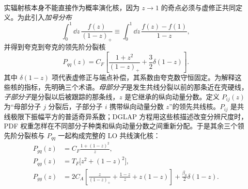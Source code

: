 实辐射核本身不能直接作为概率演化核，因为 $z\to1$ 的奇点必须与虚修正共同定义。为此引入\emph{加号分布}
\begin{equation}
 \int_0^1\dd z\,
 \frac{f(z)}{(1-z)_+}
 \equiv
 \int_0^1\dd z\,
 \frac{f(z)-f(1)}{1-z},
 \label{eq:plus-distribution-definition-dp10}
\end{equation}
并得到夸克到夸克的领先阶分裂核
\begin{equation}
 {
 P_{qq}(z)
 =C_F\left[
 \frac{1+z^2}{(1-z)_+}
 +\frac32\delta(1-z)
 \right].}
 \label{eq:Pqq-leading-dp10}
\end{equation}
其中 $\delta(1-z)$ 项代表虚修正与端点补偿，其系数由夸克数守恒固定。为解释这些核的指标，先明确三个术语。\emph{母部分子}是发生共线分裂以前的那条近在壳硬线，\emph{子部分子}是分裂以后被跟踪的那条线，$z$ 是它继承的纵向动量分数。定义 $P_{ij}(z)$ 为“母部分子 $j$ 分裂后，子部分子 $i$ 携带纵向动量分数 $z$”的领先共线核。$P_{ij}$ 是共线极限下振幅平方的普适奇异系数；DGLAP 方程用这些核描述改变分辨尺度时，PDF 权重怎样在不同部分子种类和纵向动量分数之间重新分配。于是其余三个领先阶分裂核与 $P_{qq}$ 一起构成完整的 LO 共线演化核：
\begin{equation}
{
\begin{aligned}
 P_{gq}(z)
 &=C_F\frac{1+(1-z)^2}{z},\\
 P_{qg}(z)
 &=T_F\bigl[z^2+(1-z)^2\bigr],\\
 P_{gg}(z)
 &=2C_A\left[
 \frac{z}{(1-z)_+}+\frac{1-z}{z}+z(1-z)
 \right]
 +\frac{\beta_0}{2}\delta(1-z).
\end{aligned}}
\label{eq:qcd-lo-splitting-kernels-rest-dp83}
\end{equation}


